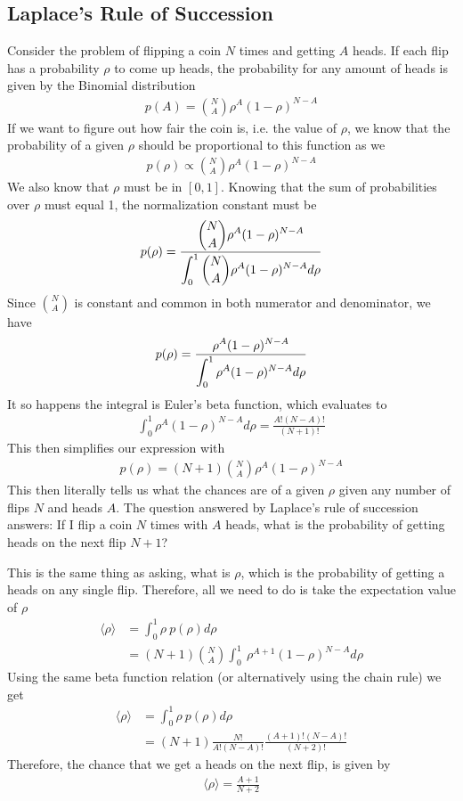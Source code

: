 \subsection{Laplace's Rule of Succession}
Consider the problem of flipping a coin $N$ times and getting $A$ heads. If each flip has a probability $\rho$ to come up heads, the probability for any amount of heads is given by the Binomial distribution
\begin{align}
p(A) = {N\choose A}\rho^A(1-\rho)^{N-A}
\end{align}
If we want to figure out how fair the coin is, i.e. the value of $\rho$, we know that the probability of a given $\rho$ should be proportional to this function as we
\begin{align}
	p(\rho) \propto {N\choose A}\rho^A(1-\rho)^{N-A}
\end{align}
We also know that $\rho$ must be in $[0,1]$. Knowing that the sum of probabilities over $\rho$ must equal 1, the normalization constant must be
\begin{align}
	p(\rho) =\frac{\displaystyle  {N\choose A}\rho^A(1-\rho)^{N-A}}{\displaystyle \int_0^1{N\choose A}\rho^A(1-\rho)^{N-A} d\rho}
\end{align}
Since ${N\choose A}$ is constant and common in both numerator and denominator, we have
\begin{align}
	p(\rho) =\frac{\displaystyle  \rho^A(1-\rho)^{N-A}}{\displaystyle \int_0^1\rho^A(1-\rho)^{N-A} d\rho}
\end{align}
It so happens the integral is Euler's beta function, which evaluates to 
\begin{align}
	\int_0^1\rho^A(1-\rho)^{N-A} d\rho = \frac{A!(N-A)!}{(N+1)!}
\end{align}
This then simplifies our expression with
\begin{align}
	p(\rho) =(N+1){N\choose A}\rho^A(1-\rho)^{N-A}
\end{align}
This then literally tells us what the chances are of a given $\rho$ given any number of flips $N$ and heads $A$. The question answered by Laplace's rule of succession answers: If I flip a coin $N$ times with $A$ heads, what is the probability of getting heads on the next flip $N+1$?

This is the same thing as asking, what is $\rho$, which is the probability of getting a heads on any single flip. Therefore, all we need to do is take the expectation value of $\rho$
\begin{align}
	\langle \rho\rangle &= \int_0^1\rho ~p(\rho) d\rho\\
	&= (N+1){N\choose A}\int_0^1 ~\rho^{A+1}(1-\rho)^{N-A} d\rho
\end{align}
Using the same beta function relation (or alternatively using the chain rule) we get
\begin{align}
	\langle \rho\rangle &= \int_0^1\rho ~p(\rho) d\rho\\
	&= (N+1)\frac{N!}{A!(N-A)!}\frac{(A+1)!(N-A)!}{(N+2)!}
\end{align}
Therefore, the chance that we get a heads on the next flip, is given by
\begin{align}
	\langle\rho\rangle = \frac{A+1}{N+2}
\end{align}

